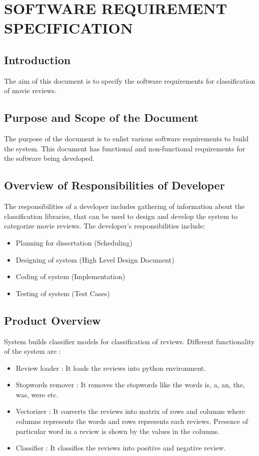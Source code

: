 \documentclass[oneside,a4paper,12pt]{pictreport}
\begin{document}
\chapter{SOFTWARE REQUIREMENT SPECIFICATION}

\section{Introduction}
The aim of this document is to specify the software requirements for classification of movie reviews.

\section{Purpose and Scope of the Document}
The purpose of the document is to enlist various software requirements to build the system. This document has functional and non-functional requirements for the software being developed.

\section{Overview of Responsibilities of Developer}
The responsibilities of a developer includes gathering of information about the classification libraries, that can be used to design and develop the system to categorize movie reviews. The developer’s responsibilities include: 
\begin{itemize}
\item Planning for dissertation (Scheduling) 
\item Designing of system (High Level Design Document)
\item Coding of system (Implementation)
\item Testing of system (Test Cases)
\end{itemize}

\section{Product Overview}
System builds classifier models for classification of reviews. Different functionality of the system are : 

\begin{itemize}
\item Review loader : It loads the reviews into python environment.
\item Stopwords remover : It removes the stopwords like the words is, a, an, the, was, were etc.
\item Vectorizer : It converts the reviews into matrix of rows and columns where columns represents the words
and rows represents each reviews. Presence of particular word in a review is shown by the values in the columns.
\item Classifier : It classifies the reviews into positive and negative review.
\end{itemize}
\end{document}
